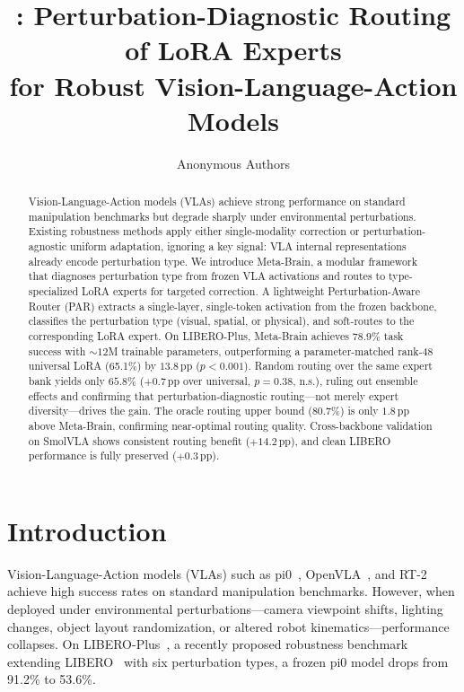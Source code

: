 \documentclass[10pt,twocolumn]{article}
\title{\ours{}: Perturbation-Diagnostic Routing of LoRA Experts\\for Robust Vision-Language-Action Models}
\author{
  Anonymous Authors
}
\newcommand{\ours}{Meta-Brain}
\newcommand{\liplus}{LIBERO-Plus}
\newcommand{\pp}{\,\text{pp}}
\begin{document}
\maketitle

\begin{abstract}
Vision-Language-Action models (VLAs) achieve strong performance on standard manipulation benchmarks but degrade sharply under environmental perturbations.
Existing robustness methods apply either single-modality correction or perturbation-agnostic uniform adaptation, ignoring a key signal: VLA internal representations already encode perturbation type.
We introduce \ours{}, a modular framework that diagnoses perturbation type from frozen VLA activations and routes to type-specialized LoRA experts for targeted correction.
A lightweight Perturbation-Aware Router (PAR) extracts a single-layer, single-token activation from the frozen backbone, classifies the perturbation type (visual, spatial, or physical), and soft-routes to the corresponding LoRA expert.
On \liplus{}, \ours{} achieves 78.9\% task success with ${\sim}12$M trainable parameters, outperforming a parameter-matched rank-48 universal LoRA (65.1\%) by $13.8\pp$ ($p{<}0.001$).
Random routing over the same expert bank yields only $65.8\%$ ($+0.7\pp$ over universal, $p{=}0.38$, n.s.), ruling out ensemble effects and confirming that perturbation-diagnostic routing---not merely expert diversity---drives the gain.
The oracle routing upper bound (80.7\%) is only $1.8\pp$ above \ours{}, confirming near-optimal routing quality.
Cross-backbone validation on SmolVLA shows consistent routing benefit ($+14.2\pp$), and clean LIBERO performance is fully preserved ($+0.3\pp$).
\end{abstract}

\section{Introduction}
\label{sec:intro}

Vision-Language-Action models (VLAs) such as pi0~\cite{black2024pi0}, OpenVLA~\cite{kim2024openvla}, and RT-2~\cite{brohan2023rt2} achieve high success rates on standard manipulation benchmarks.
However, when deployed under environmental perturbations---camera viewpoint shifts, lighting changes, object layout randomization, or altered robot kinematics---performance collapses.
On \liplus{}~\cite{liberoplus2026}, a recently proposed robustness benchmark extending LIBERO~\cite{liu2023libero} with six perturbation types, a frozen pi0 model drops from 91.2\% to 53.6\%.
\end{document}
